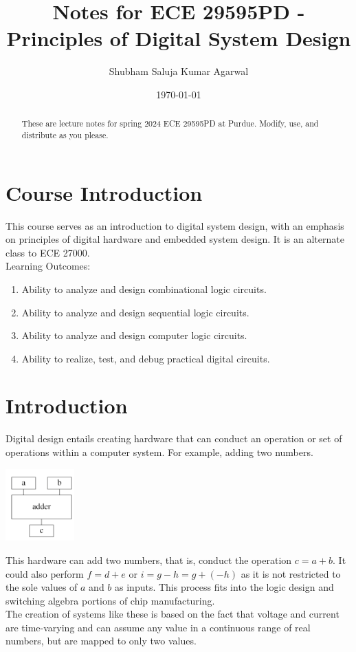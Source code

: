 \documentclass[nobib]{tufte-handout}
\title{Notes for ECE 29595PD - Principles of Digital System Design}
\author[Shubham Saluja Kumar Agarwal]{Shubham Saluja Kumar Agarwal}
\date{\today}  %
\begin{document}
\maketitle

\begin{abstract}
These are lecture notes for spring 2024 ECE 29595PD at Purdue. Modify, use, and distribute as you please.
\end{abstract}

\tableofcontents

\section{Course Introduction}

This course serves as an introduction to digital system design, with an emphasis
on principles of digital hardware and embedded system design. It is an alternate class to ECE 27000. \\
Learning Outcomes:
\begin{enumerate}
    \item Ability to analyze and design combinational logic circuits.
    \item Ability to analyze and design sequential logic circuits.
    \item Ability to analyze and design computer logic circuits.
    \item Ability to realize, test, and debug practical digital circuits.
\end{enumerate}

\pagebreak 

\section{Introduction}

Digital design entails creating hardware that can conduct an operation or set of operations within a computer system. For example, adding two numbers. \\
\begin{center}
    \includegraphics[width= 100px]{images/Screenshot 2024-01-08 151414.png}
\end{center}
This hardware can add two numbers, that is, conduct the operation $c=a+b$. It could also perform $f=d+e$ or $i=g-h=g+(-h)$ as it is not restricted to the sole values of $a$ and $b$ as inputs. This process fits into the logic design and switching algebra portions of chip manufacturing.\\
The creation of systems like these is based on the fact that voltage and current are time-varying and can assume any value in a continuous range of real numbers, but are mapped to only two values.
\end{document}
